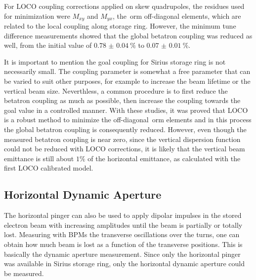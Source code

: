 For LOCO coupling corrections applied on skew quadrupoles, the residues used for minimization were $M_{xy}$ and $M_{yx}$, the~\gls{orm} off-diagonal elements, which are related to the local coupling along storage ring. However, the minimum tune difference measurements showed that the global betatron coupling was reduced as well, from the initial value of $\SI{0.78(4)}{\%}$ to $\SI{0.07(1)}{\%}$.

It is important to mention the goal coupling for Sirius storage ring is not necessarily small. The coupling parameter is somewhat a free parameter that can be varied to suit other purposes, for example to increase the beam lifetime or the vertical beam size. Neverthless, a common procedure is to first reduce the betatron coupling as much as possible, then increase the coupling towards the goal value in a controlled manner. With these studies, it was proved that LOCO is a robust method to minimize the off-diagonal~\gls{orm} elements and in this process the global betatron coupling is consequently reduced. However, even though the measured betatron coupling is near zero, since the vertical dispersion function could not be reduced with LOCO corrections, it is likely that the vertical beam emittance is still about $1\%$ of the horizontal emittance, as calculated with the first LOCO calibrated model.

\subsection{Horizontal Dynamic Aperture}
The horizontal pinger can also be used to apply dipolar impulses in the stored electron beam with increasing amplitudes until the beam is partially or totally lost. Measuring with BPMs the transverse oscillations over the turns, one can obtain how much beam is lost as a function of the transverse positions. This is basically the dynamic aperture measurement. Since only the horizontal pinger was available in Sirius storage ring, only the horizontal dynamic aperture could be measured.

